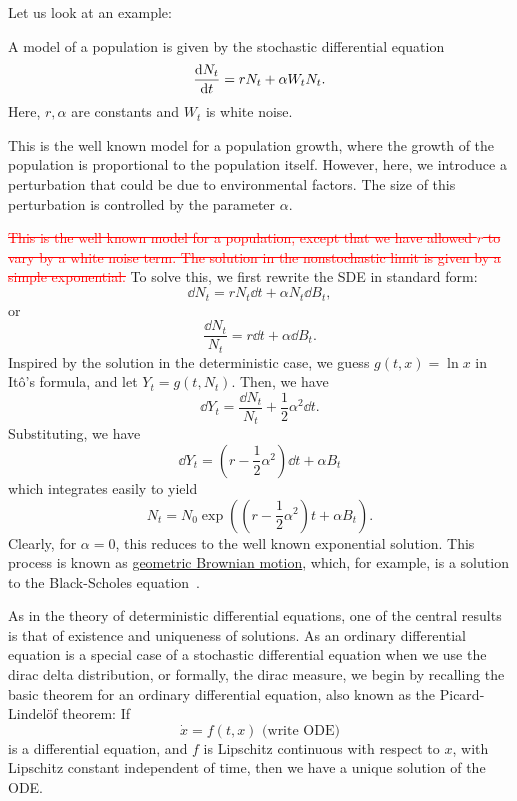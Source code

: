 \documentclass[prb,12pt]{revtex4-2}
\theoremstyle{definition}
\theoremstyle{definition}
\theoremstyle{definition}
\begin{document}
	Let us look at an example:
	\begin{Example}
		A model of a population is given by the stochastic differential equation
		\[\dv{N_t}{t} = r N_t + \alpha W_t N_t.\]
		Here, $r,\alpha$ are constants and $W_t$ is white noise.
	\end{Example}
	{\color{red} This is the well known model for a population growth, where the growth of the population is proportional to the population itself. However, here, we introduce a perturbation that could be due to environmental factors. The size of this perturbation is controlled by the parameter $\alpha$.}
		
	\textcolor{red}{\sout{This is the well known model for a population, except that we have allowed $r$ to vary by a white noise term. The solution in the nonstochastic limit is given by a simple exponential.}} To solve this, we first rewrite the SDE in standard form:
	\[\dd{N_t}=r N_t\dd{t}+\alpha N_t \dd{B_t},\]
	or
	\[\frac{\dd{N_t}}{N_t} = r \dd{t} + \alpha \dd{B_t}.\]
	Inspired by the solution in the deterministic case, we guess $g(t, x)=\ln x$ in Itô's formula, and let $Y_t=g(t, N_t)$. Then, we have
	\[\dd{Y_t}=\frac{\dd{N_t}}{N_t}+\frac 12 \alpha^2 \dd{t}.\]
	Substituting, we have
	\[\dd{Y_t} = \left(r- \frac 12\alpha^2 \right)\dd{t} +\alpha B_t\]
	which integrates easily to yield
	\[N_t = N_0 \exp\left(\left(r - \frac 12 \alpha^2\right)t+\alpha B_t\right).\]
	Clearly, for $\alpha=0$, this reduces to the well known exponential solution. This process is known as \uline{geometric Brownian motion}, which, for example, is a solution to the Black-Scholes equation~\cite{inbook}.
	
	{\color{red} As in the theory of deterministic differential equations, one of the central results is that of existence and uniqueness of solutions. As an ordinary differential equation is a special case of a stochastic differential equation when we use the dirac delta distribution, or formally, the dirac measure, we begin by recalling the basic theorem for an ordinary differential equation, also known as the Picard-Lindelöf theorem: If
	\[\dot{x}= f(t,x)\text{ (write ODE)}\]
	is a differential equation, and $f$ is Lipschitz continuous with respect to $x$, with Lipschitz constant independent of time, then we have a unique solution of the ODE.}
	
\end{document}
